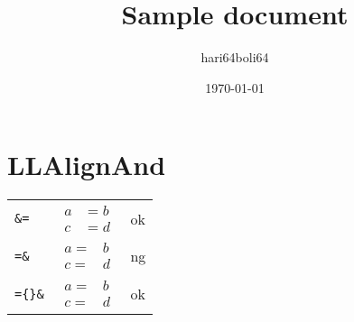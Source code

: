 \documentclass[a4paper]{article}
\newcommand{\tA}[1]{\textcolor{cA}{#1}}
\newcommand{\tD}[1]{\textcolor{cD}{#1}}
\begin{document}
\title{Sample document}
\author{hari64boli64}
\date{\today}
\maketitle

\section{LLAlignAnd}

\begin{table}[H]
	\centering
	\begin{tabular}{lll}
		\verb|&=|        &
		$\begin{aligned}
				 a & = b \\
				 c & = d
			 \end{aligned}$ &
		\tA{ok}            \\[0.3cm]
		\verb|=&|        &
		$\begin{aligned}
				 a = & b \\
				 c = & d
			 \end{aligned}$ &
		\tD{ng}            \\[0.3cm]
		\verb|={}&|      &
		$\begin{aligned}
				 a = {} & b \\
				 c = {} & d
			 \end{aligned}$ &
		\tA{ok}
	\end{tabular}
\end{table}
\end{document}
